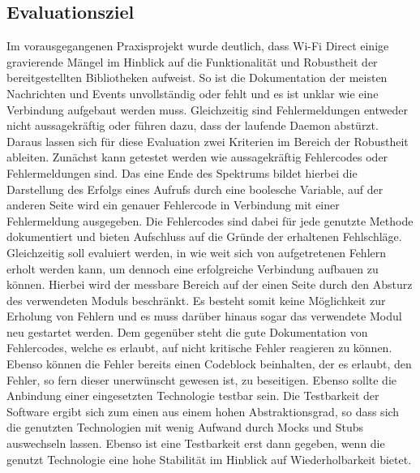         \subsection{Evaluationsziel}	
        Im vorausgegangenen Praxisprojekt wurde deutlich, dass Wi-Fi Direct einige gravierende Mängel im Hinblick auf die Funktionalität und Robustheit der bereitgestellten Bibliotheken aufweist. So ist die Dokumentation der meisten Nachrichten und Events unvollständig oder fehlt und es ist unklar wie eine Verbindung aufgebaut werden muss. Gleichzeitig sind Fehlermeldungen entweder nicht aussagekräftig oder führen dazu, dass der laufende Daemon abstürzt.
        Daraus lassen sich für diese Evaluation zwei Kriterien im Bereich der Robustheit ableiten.
        Zunächst kann getestet werden wie aussagekräftig Fehlercodes oder Fehlermeldungen sind.
        Das eine Ende des Spektrums bildet hierbei die Darstellung des Erfolgs eines Aufrufs durch eine boolesche Variable, auf der anderen Seite wird ein genauer Fehlercode in Verbindung mit einer Fehlermeldung ausgegeben. Die Fehlercodes sind dabei für jede genutzte Methode dokumentiert und bieten Aufschluss auf die Gründe der erhaltenen Fehlschläge. 
        Gleichzeitig soll evaluiert werden, in wie weit sich von aufgetretenen Fehlern erholt werden kann, um dennoch eine erfolgreiche Verbindung aufbauen zu können. Hierbei wird der messbare Bereich auf der einen Seite durch den Absturz des verwendeten Moduls beschränkt. Es besteht somit keine Möglichkeit zur Erholung von Fehlern und es muss darüber hinaus sogar das verwendete Modul neu gestartet werden. Dem gegenüber steht die gute Dokumentation von Fehlercodes, welche es erlaubt, auf nicht kritische Fehler reagieren zu können. Ebenso können die Fehler bereits einen Codeblock beinhalten, der es erlaubt, den Fehler, so fern dieser unerwünscht gewesen ist, zu beseitigen.
        Ebenso sollte die Anbindung einer eingesetzten Technologie testbar sein. Die Testbarkeit der Software ergibt sich zum einen aus einem hohen Abstraktionsgrad, so dass sich die genutzten Technologien mit wenig Aufwand durch Mocks und Stubs auswechseln lassen. Ebenso ist eine Testbarkeit erst dann gegeben, wenn die genutzt Technologie eine hohe Stabilität im Hinblick auf Wiederholbarkeit bietet.
        
